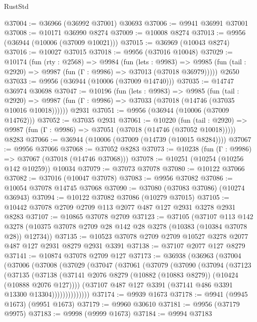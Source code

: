 \begin{lexlean}{RustStd}
\begin{coremodule}
@37004 := @36966 (@36992 @37001) @30693
@37006 := @9941 @36991 @37001
@37008 := @10171 @36990 @8274
@37009 := @10008 @8274
@37013 := @9956 (@36944 (@10006 (@37009 @10021)))
@37015 := @36969 (@10043 @8274)
@37016 := @10027 @37015
@37018 := @9956 (@37016 @10048)
@37029 := @10174
    (fun (rty : @2568) =>
    @9984
      (fun (lets : @9983) =>
      @9985 (fun (tail : @2920) => @9987 (fun (Γ : @9986) => @37013 (@37018 @36979)))))
    @2650
@37033 := @9956 (@36944 (@10006 (@37009 @14740)))
@37035 := @14747 @36974 @30698
@37047 := @10196
    (fun (lets : @9983) =>
    @9985
      (fun (tail : @2920) =>
      @9987 (fun (Γ : @9986) => @37033 (@37018 (@14746 (@37035 @10016 @10018))))))
    @2931
@37051 := @9956 (@36944 (@10006 (@37009 @14762)))
@37052 := @37035 @2931
@37061 := @10220
    (fun (tail : @2920) => @9987 (fun (Γ : @9986) => @37051 (@37018 (@14746 (@37052 @10018)))))
    @8283
@37066 := @36944 (@10006 (@37009 (@14739 (@10015 @8284))))
@37067 := @9956 @37066
@37068 := @37052 @8283
@37073 := @10238 (fun (Γ : @9986) => @37067 (@37018 (@14746 @37068)))
@37078 := @10251 (@10254 (@10256 @142 @10259)) @10034
@37079 := @37073 @37078
@37080 := @10122 @37066
@37082 := @37016 (@10047 @37078)
@37083 := @9956 @37082
@37086 := @10054 @37078 @14745 @37068
@37090 := @37080 (@37083 @37086) (@10274 @36943)
@37094 := @10122 @37082 @37086 (@10279 @37015)
@37105 := @10442 @37078 @2709 @2709 @113 @2077 @487 @127 @2931 @3278 @2931 @8283
@37107 := @10865 @37078 @2709
@37123 := @37105
    (@37107
      @113
      @142
      @3278
      (@10375 @37078 @2709 @28 @142 @28 @3278 (@10383 (@10384 @37078 @28)) @12734))
@37135 := @10523 @37078 @2709 @2709 @10527 @3278 @2077 @487 @127 @2931 @8279 @2931 @3391
@37138 := @37107 @2077 @127 @8279
@37141 := @10874 @37078 @2709 @127
@37173 := @36938
    (@36963
      (@37004
        (@37006
          (@37008
            (@37029
              (@37047
                (@37061
                  (@37079
                    (@37090
                      (@37094
                        (@37123
                          (@37135
                            (@37138
                              (@37141
                                @2076
                                @8279
                                (@10882 (@10883 @8279))
                                (@10424 (@10888 @2076 @127))))
                            (@37107 @487 @127 @3391 (@37141 @486 @3391 @13300 @13304))))))))))))))
@37174 := @9939 @1673
@37178 := @9941 (@9945 @1673) (@9951 @1673)
@37179 := @9960 @30610
@37181 := @9956 (@37179 @9975)
@37183 := @9998 (@9999 @1673)
@37184 := @9994 @37183

\end{coremodule}
\end{lexlean}
